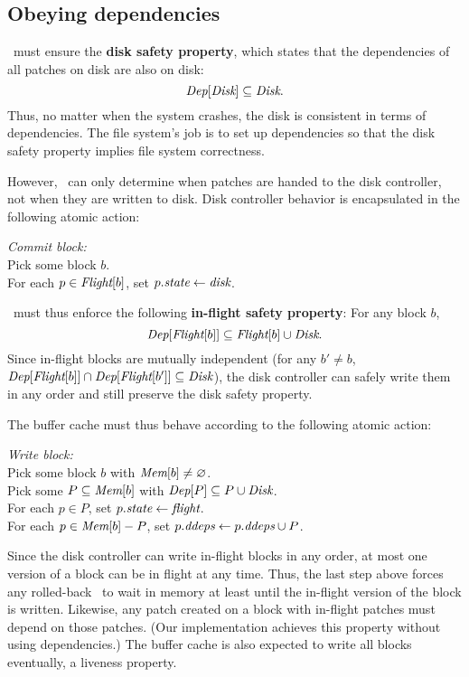 \subsection{Obeying dependencies}

\Kudos\ must ensure the \textbf{disk safety property}, which states that
 the dependencies of all patches on disk are also on disk:
%
\[ \PDepset{\PDisk} \subseteq \PDisk. \]
%
Thus, no matter when the system crashes, the disk is consistent in terms of
dependencies.
%
The file system's job is to set up dependencies so that the disk safety
property implies file system correctness.

However, \Kudos\ can only determine when patches are handed to the disk
 controller, not when they are written to disk.
%
Disk controller behavior is encapsulated in the following atomic action:

\begin{tabbing}
\textit{Commit block:} \\
\quad Pick some block $b$. \\
\quad For each $p \in \PInf[b]$, set $p.\textit{state} \gets \textit{disk}$.
\end{tabbing}

\noindent
%
\Kudos\ must thus enforce the following \textbf{in-flight
 safety property}: For any block $b$,
%
\[ \PDepset{\PInf[b]} \subseteq \PInf[b] \cup \PDisk . \]
%
Since in-flight blocks are mutually independent (for any $b' \neq b$,
 $\PDepset{\PInf[b]} \cap \PDepset{\PInf[b']} \subseteq \PDisk$), the disk
 controller can safely write them in any order and still preserve the disk
 safety property.


The buffer cache must thus behave according to the following atomic action:

\begin{tabbing}
\textit{Write block:} \\
\quad Pick some block $b$ with $\PMem[b] \neq \emptyset$. \\
\quad Pick some $P \subseteq \PMem[b]$ with $\PDepset{P} \subseteq P \cup
\PDisk$. \\
\quad For each $p \in P$, set $p.\textit{state} \gets \textit{flight}$. \\
\quad For each $p \in \PMem[b]-P$, set $\PDDepset{p} \gets \PDDepset{p}
\cup P$.
\end{tabbing}

\noindent
%
Since the disk controller can write in-flight blocks in any order, at most
one version of a block can be in flight at any time.
%
Thus, the last step above forces any rolled-back \patches\ to wait in
memory at least until the in-flight version of the block is written.
%
Likewise, any patch created on a block with in-flight patches must depend
on those patches.
%
(Our implementation achieves this property without using dependencies.)
%
The buffer cache is also expected to write all blocks eventually, a
 liveness property.


